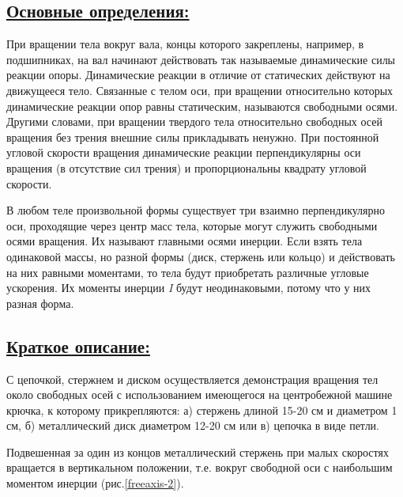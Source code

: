 \documentclass[14pt,a4paper,oneside]{extarticle}	%
\begin{document}
\newpage
\subsection*{\underline{Основные определения:}}

%

При вращении тела вокруг вала, концы которого закреплены, например, в подшипниках, на вал начинают действовать так называемые динамические силы реакции опоры.
Динамические реакции в отличие от статических действуют на движущееся тело.
Связанные с телом оси, при вращении относительно которых динамические реакции опор равны статическим, называются свободными осями. Другими словами, при вращении твердого тела относительно свободных осей вращения без трения внешние силы прикладывать ненужно.
При постоянной угловой скорости вращения динамические реакции перпендикулярны оси вращения (в отсутствие сил трения) и пропорциональны квадрату угловой скорости.

В любом теле произвольной формы существует три взаимно перпендикулярно оси, проходящие через центр масс тела, которые могут служить свободными осями вращения.
Их называют главными осями инерции.
Если взять тела одинаковой массы, но разной формы (диск, стержень или кольцо) и действовать на них равными моментами, то тела будут приобретать различные угловые ускорения. 
Их моменты инерции \textit{I} будут неодинаковыми, потому что у них разная форма.

\newpage
\subsection*{\underline{Краткое описание:}}

С цепочкой, стержнем и диском осуществляется демонстрация вращения тел около свободных осей с использованием имеющегося на центробежной машине крючка, к которому прикрепляются: а) стержень длиной 15-20 см и диаметром 1 см, б) металлический диск диаметром 12-20 см или в) цепочка в виде петли.

Подвешенная за один из концов металлический стержень при малых скоростях вращается в вертикальном положении, т.е. вокруг свободной оси с наибольшим моментом инерции (рис.\ref{freeaxis-2}).
\end{document}
